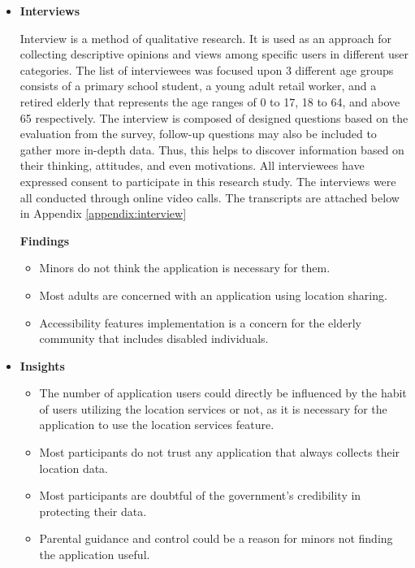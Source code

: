 \begin{enumerate}[a)]
\begin{itemize}
            \item \textbf{Interviews}
              \par Interview is a method of qualitative research. It is used as an approach for collecting descriptive
              opinions and views among specific users in different user categories. The list of interviewees was
              focused upon 3 different age groups consists of a primary school student, a young adult retail worker,
              and a retired elderly that represents the age ranges of 0 to 17, 18 to 64, and above 65 respectively.
              The interview is composed of designed questions based on the evaluation from the survey, follow-up
              questions may also be included to gather more in-depth data. Thus, this helps to discover information
              based on their thinking, attitudes, and even motivations. All interviewees have expressed consent to
              participate in this research study. The interviews were all conducted through online video calls. The
              transcripts are attached below in Appendix \ref{appendix:interview}
              \par \textbf{Findings}
                \begin{itemize}
                  \item Minors do not think the application is necessary for them.
                  \item Most adults are concerned with an application using location sharing.
                  \item Accessibility features implementation is a concern for the elderly community that includes disabled individuals.
                \end{itemize}
            \item \textbf{Insights}
              \begin{itemize}
                \item The number of application users could directly be influenced by the habit of users utilizing the location services or not, as it is necessary for the application to use the location services feature.
                \item Most participants do not trust any application that always collects their location data.
                \item Most participants are doubtful of the government's credibility in protecting their data.
                \item Parental guidance and control could be a reason for minors not finding the application useful.

\end{itemize}
\end{itemize}
\end{enumerate}
